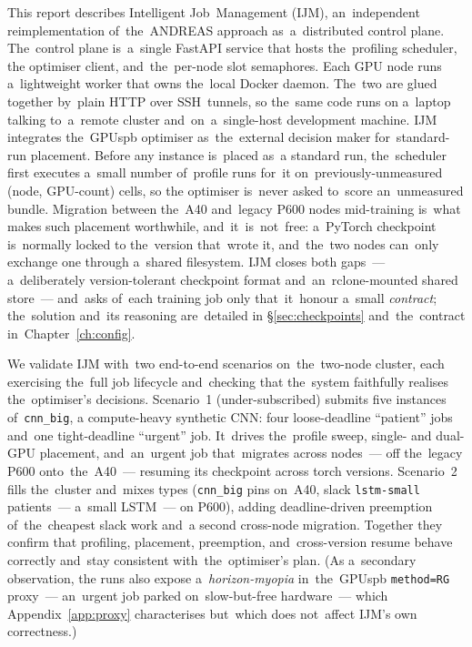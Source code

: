 This report describes Intelligent Job~Management (IJM), an~independent
reimplementation of~the~ANDREAS approach as~a~distributed control plane.
The~control plane is~a~single FastAPI service that hosts the~profiling scheduler, the
optimiser client, and~the~per-node slot semaphores.  Each GPU node runs
a~lightweight worker that owns the~local Docker daemon.  The~two are
glued together by~plain HTTP over SSH~tunnels, so the~same code runs on
a~laptop talking to~a~remote cluster and~on~a~single-host development
machine.  IJM integrates the~GPUspb optimiser as~the~external decision
maker for~standard-run placement.  Before any instance is~placed as~a
standard run, the~scheduler first executes a~small number of~profile
runs for~it on~previously-unmeasured (node, GPU-count) cells, so the
optimiser is~never asked to~score an~unmeasured bundle.  Migration between
the~A40 and~legacy P600 nodes mid-training is~what makes such placement
worthwhile, and~it~is~not~free: a~PyTorch checkpoint is~normally locked to
the~version that~wrote it, and~the~two nodes can~only exchange one through
a~shared filesystem.  IJM closes both gaps~--- a~deliberately
version-tolerant checkpoint format and~an~rclone-mounted shared store~---
and~asks of~each training job only that~it~honour a~small
\emph{contract}; the~solution and~its reasoning are~detailed in
\S\ref{sec:checkpoints} and~the~contract in~Chapter~\ref{ch:config}.

We validate IJM with~two end-to-end scenarios on~the~two-node cluster,
each exercising the~full job lifecycle and~checking that the~system
faithfully realises the~optimiser's decisions.  Scenario~1
(under-subscribed) submits five instances of~\texttt{cnn\_big}, a
compute-heavy synthetic CNN: four loose-deadline ``patient'' jobs and~one
tight-deadline ``urgent'' job.  It~drives the~profile sweep, single- and
dual-GPU placement, and~an~urgent job that~migrates across nodes~--- off
the~legacy P600 onto~the~A40~--- resuming its checkpoint across torch
versions.  Scenario~2 fills the~cluster and~mixes types (\texttt{cnn\_big}
pins on~A40, slack \texttt{lstm-small} patients~--- a~small LSTM~--- on
P600), adding deadline-driven preemption of~the~cheapest slack work and~a
second cross-node migration.  Together they confirm that profiling,
placement, preemption, and~cross-version resume behave correctly and~stay
consistent with~the~optimiser's plan.  (As a~secondary observation, the
runs also expose a~\emph{horizon-myopia} in~the~GPUspb \texttt{method=RG}
proxy~--- an~urgent job parked on~slow-but-free hardware~--- which
Appendix~\ref{app:proxy} characterises but~which does not~affect IJM's own
correctness.)

